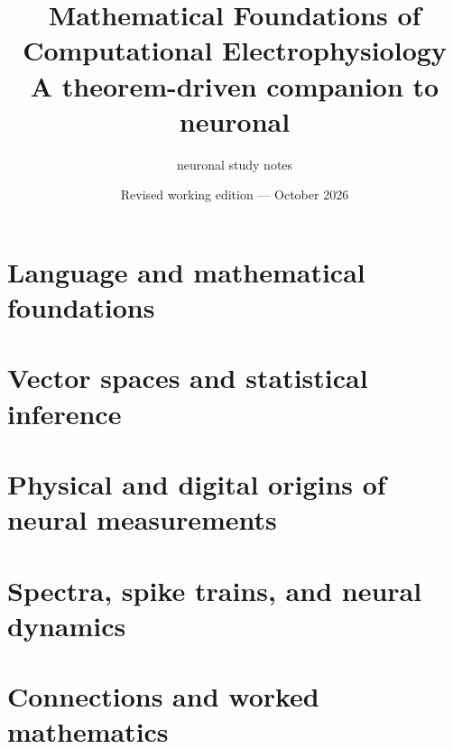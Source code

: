 \documentclass[11pt,a4paper,oneside]{book}
\title{Mathematical Foundations of Computational Electrophysiology\\
\large A theorem-driven companion to neuronal}
\author{neuronal study notes}
\date{Revised working edition --- October 2026}
\begin{document}
\frontmatter
\hypersetup{pageanchor=false}
\maketitle
\hypersetup{pageanchor=true}
\tableofcontents

\mainmatter
\part{Language and mathematical foundations}



\part{Vector spaces and statistical inference}



\part{Physical and digital origins of neural measurements}


\part{Spectra, spike trains, and neural dynamics}












\part{Connections and worked mathematics}




\backmatter


\end{document}
